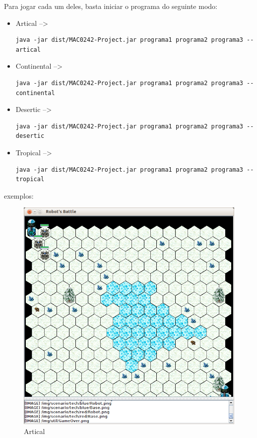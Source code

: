 \documentclass[a4paper]{article}
\begin{document}
{{{{Para jogar cada um deles, basta iniciar o programa do seguinte modo:

\begin{itemize}

	\item Artical --> \begin{verbatim}java -jar dist/MAC0242-Project.jar programa1 programa2 programa3 --artical\end{verbatim}

	\item Continental --> \begin{verbatim}java -jar dist/MAC0242-Project.jar programa1 programa2 programa3 --continental\end{verbatim}
	
	\item Desertic --> \begin{verbatim}java -jar dist/MAC0242-Project.jar programa1 programa2 programa3 --desertic\end{verbatim}
	
	\item Tropical --> \begin{verbatim}java -jar dist/MAC0242-Project.jar programa1 programa2 programa3 --tropical\end{verbatim}

\end{itemize}


\newpage %

{\textcolor{NavyBlue}{\LARGE exemplos:}

\bigskip

\begin{figure}[h]
	\centering
    \includegraphics[scale=0.3]{img/artical.png}
    \caption{Artical}
\end{figure}

}}}}}
\end{document}
